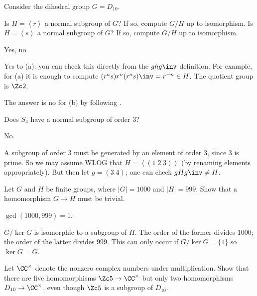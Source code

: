 \begin{problem}
	Consider the dihedral group $G = D_{10}$.
	\begin{enumerate}[(a)]
		\ii Is $H = \left< r \right>$ a normal subgroup of $G$?
		If so, compute $G/H$ up to isomorphism.
		\ii Is $H = \left< s \right>$ a normal subgroup of $G$?
		If so, compute $G/H$ up to isomorphism.
	\end{enumerate}
	\begin{hint}
		Yes, no.
	\end{hint}
	\begin{sol}
		Yes to (a): you can check this directly
		from the $ghg\inv$ definition.
		For example, for (a)
		it is enough to compute $(r^a s) r^n (r^a s)\inv = r^{-n} \in H$.
		The quotient group is $\Zc2$.

		The answer is no for (b) by following
		.
	\end{sol}
\end{problem}

\begin{problem}
	Does $S_4$ have a normal subgroup of order $3$?
	\begin{hint}
		No.
	\end{hint}
	\begin{sol}
		A subgroup of order $3$ must be generated by
		an element of order $3$, since $3$ is prime.
		So we may assume WLOG that $H = \left< (1\; 2 \; 3) \right>$
		(by renaming elements appropriately).
		But then let $g = (3 \; 4)$; one can check $gHg\inv \neq H$.
	\end{sol}
\end{problem}

\begin{problem}
	Let $G$ and $H$ be finite groups, where $\left\lvert G \right\rvert = 1000$
	and $\left\lvert H \right\rvert = 999$.
	Show that a homomorphism $G \to H$ must be trivial.
	\begin{hint}
		$\gcd(1000,999)=1$.
	\end{hint}
	\begin{sol}
		$G/\ker G$ is isomorphic to a subgroup of $H$.
		The order of the former divides $1000$;
		the order of the latter divides $999$.
		This can only occur if $G / \ker G = \{1\}$
		so $\ker G = G$.
	\end{sol}
\end{problem}

\begin{problem}
	Let $\CC^\times$ denote the nonzero complex numbers under multiplication.
	Show that there are five homomorphisms $\Zc5 \to \CC^\times$
	but only two homomorphisms $D_{10} \to \CC^\times$,
	even though $\Zc5$ is a subgroup of $D_{10}$.
\end{problem}

